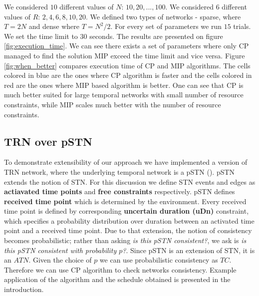 We considered $10$ different values of $N$: $10, 20, ..., 100$. We considered $6$ different values of $R$: $2, 4, 6, 8, 10, 20$. We defined two types of networks - sparse, where $T = 2N$ and dense where $T = N^2/2$. For every set of parameters we run $15$ trials. We set the time limit to $30$ seconds. The results are presented on figure \ref{fig:execution_time}. We can see there exists a set of parameters where only CP managed to find the solution MIP exceed the time limit and vice versa. Figure \ref{fig:when_better} compares execution time of CP and MIP algorithms. The cells colored in blue are the ones where CP algorithm is faster and the cells colored in red are the ones where MIP based algorithm is better. One can see that CP is much better suited for large temporal networks with small number of resource constraints, while MIP scales much better with the number of resource constraints.

\subsection{TRN over pSTN}
To demonstrate extensibility of our approach we have implemented a version of TRN network, where the underlying temporal network is a pSTN (\cite{Fang2014}). pSTN extends the notion of STN. For this discussion we define STN events and edges as \textbf{actiavated time points} and \textbf{free constraints} respectively. pSTN defines \textbf{received time point} which is determined by the environment. Every received time point is defined by corresponding \textbf{uncertain duration (uDn)} constraint, which specifies a probability distribution over duration between an activated time point and a received time point. Due to that extension, the notion of consistency becomes probabilistic; rather than asking \textit{is this pSTN consistent?}, we ask is \textit{is this pSTN consistent with probability $p$?}. Since pSTN is an extension of STN, it is an $ATN$. Given the choice of $p$ we can use probabilistic consistency as $TC$. Therefore we can use CP algorithm to check networks consistency. Example application of the algorithm and the schedule obtained is presented in the introduction.
